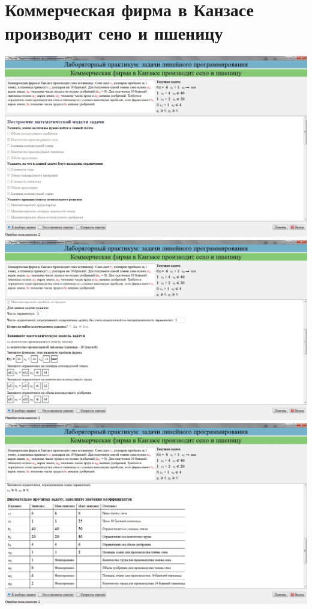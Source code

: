\section{Коммерческая фирма в Канзасе производит сено и пшеницу}

\includegraphics[width=\linewidth]{om_hw_02/images/3_1.jpg}\\
\includegraphics[width=\linewidth]{om_hw_02/images/3_2.jpg}\\
\includegraphics[width=\linewidth]{om_hw_02/images/3_3.jpg}\\
